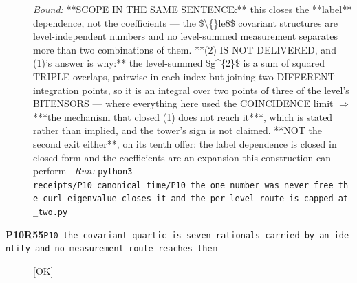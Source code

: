 \begin{description}
 \emph{Bound:}  **SCOPE IN THE SAME SENTENCE:** this closes the **label** dependence, not the coefficients --- the \$\textbackslash\{\}le8\$ covariant structures are level-independent numbers and no level-summed measurement separates more than two combinations of them.  **(2) IS NOT DELIVERED, and (1)'s answer is why:** the level-summed \$g\textasciicircum{}\{2\}\$ is a sum of squared TRIPLE overlaps, pairwise in each index but joining two DIFFERENT integration points, so it is an integral over two points of three of the level's BITENSORS --- where everything here used the COINCIDENCE limit \ensuremath{\Rightarrow} ***the mechanism that closed (1) does not reach it***, which is stated rather than implied, and the tower's sign is not claimed.  **NOT the second exit either**, on its tenth offer: the label dependence is closed in closed form and the coefficients are an expansion this construction can perform
\ \emph{Run:} \texttt{python3 receipts/P10\_canonical\_time/P10\_the\_one\_number\_was\_never\_free\_the\_curl\_eigenvalue\_closes\_it\_and\_the\_per\_level\_route\_is\_capped\_at\_two.py}
\item[\rcptlabel{P10_the_covariant_quartic_is_seven_rationals_carried_by_an_identity_and_no_measurement_route_reaches_them}{P10R55}\textbf{P10R55}\quad\texttt{P10\_the\_covariant\_quartic\_is\_seven\_rationals\_carried\_by\_an\_identity\_and\_no\_measurement\_route\_reaches\_them}]\hfill\textsf{[OK]}\\

\end{description}
